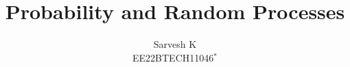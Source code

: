 \documentclass[book,11pt]{IEEEtran}
\DeclareMathOperator*{\Res}{Res}
\begin{document}
\newtheorem{theorem}{Theorem}[section]
\newtheorem{problem}{Problem}
\newtheorem{proposition}{Proposition}[section]
\newtheorem{lemma}{Lemma}[section]
\newtheorem{corollary}[theorem]{Corollary}
\newtheorem{example}{Example}[section]
\newtheorem{definition}[problem]{Definition}
\newcommand{\BEQA}{\begin{eqnarray}}
\newcommand{\EEQA}{\end{eqnarray}}
\newcommand{\define}{\stackrel{\triangle}{=}}

\providecommand{\mbf}{\mathbf}
\providecommand{\pr}[1]{\ensuremath{\Pr\left(#1\right)}}
\providecommand{\qfunc}[1]{\ensuremath{Q\left(#1\right)}}
\providecommand{\sbrak}[1]{\ensuremath{{}\left[#1\right]}}
\providecommand{\lsbrak}[1]{\ensuremath{{}\left[#1\right.}}
\providecommand{\rsbrak}[1]{\ensuremath{{}\left.#1\right]}}
\providecommand{\brak}[1]{\ensuremath{\left(#1\right)}}
\providecommand{\lbrak}[1]{\ensuremath{\left(#1\right.}}
\providecommand{\rbrak}[1]{\ensuremath{\left.#1\right)}}
\providecommand{\cbrak}[1]{\ensuremath{\left\{#1\right\}}}
\providecommand{\lcbrak}[1]{\ensuremath{\left\{#1\right.}}
\providecommand{\rcbrak}[1]{\ensuremath{\left.#1\right\}}}
\theoremstyle{remark}
\newtheorem{rem}{Remark}
\newcommand{\sgn}{\mathop{\mathrm{sgn}}}
\providecommand{\abs}[1]{\left\vert#1\right\vert}
\providecommand{\res}[1]{\Res\displaylimits_{#1}} 
\providecommand{\norm}[1]{\left\lVert#1\right\rVert}
\providecommand{\mtx}[1]{\mathbf{#1}}
\providecommand{\mean}[1]{E\left[ #1 \right]}
\providecommand{\fourier}{\overset{\mathcal{F}}{ \rightleftharpoons}}
\providecommand{\system}[1]{\overset{\mathcal{#1}}{ \longleftrightarrow}}
\newcommand{\solution}{\noindent \textbf{Solution: }}
\newcommand{\cosec}{\,\text{cosec}\,}
\providecommand{\dec}[2]{\ensuremath{\overset{#1}{\underset{#2}{\gtrless}}}}
\newcommand{\myvec}[1]{\ensuremath{\begin{pmatrix}#1\end{pmatrix}}}
\newcommand{\mydet}[1]{\ensuremath{\begin{vmatrix}#1\end{vmatrix}}}
\let\vec\mathbf
\def\putbox#1#2#3{\makebox[0in][l]{\makebox[#1][l]{}\raisebox{\baselineskip}[0in][0in]{\raisebox{#2}[0in][0in]{#3}}}}
     \def\rightbox#1{\makebox[0in][r]{#1}}
     \def\centbox#1{\makebox[0in]{#1}}
     \def\topbox#1{\raisebox{-\baselineskip}[0in][0in]{#1}}
     \def\midbox#1{\raisebox{-0.5\baselineskip}[0in][0in]{#1}}

\vspace{3cm}
\title{
Probability and Random Processes
}
\author{ Sarvesh K\\EE22BTECH11046$^{*}$%
	
}	
\end{document}
